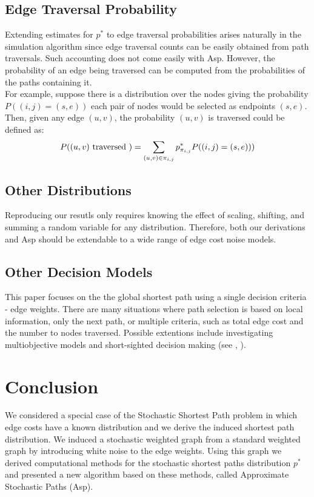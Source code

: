 \documentclass[twocolumn]{article}
\begin{document}
\subsection{Edge Traversal Probability}
Extending estimates for $p^{*}$ to edge traversal probabilities arises naturally in the simulation algorithm since edge traversal counts can be easily obtained from path traversals. Such accounting does not come easily with Asp. However, the probability of an edge being traversed can be computed from the probabilities of the paths containing it. \\

For example, suppose there is a distribution over the nodes giving the probability $P( (i,j) = (s,e))$ each pair of nodes would be selected as endpoints $(s,e)$. Then, given any edge $(u,v)$, the probability $(u,v)$ is traversed could be defined as:
\begin{gather}
P( (u,v) \text{ traversed } ) = \sum_{(u,v) \in \pi_{i,j}} p^{*}_{\pi_{i,j}} P( (i,j) = (s,e))) \notag
\end{gather}


\subsection{Other Distributions}
Reproducing our resutls only requires knowing the effect of scaling, shifting, and summing a random variable for any distribution. Therefore, both our derivations and Asp should be extendable to a wide range of edge cost noise models.

\subsection{Other Decision Models}
This paper focuses on the the global shortest path using a single decision criteria - edge weights. There are many situations where path selection is based on local information, only the next path, or multiple criteria, such as total edge cost and the number to nodes traversed. Possible extentions include investigating multiobjective models and short-sighted decision making (see \cite{multiobj}, \cite{hall_1986}).


\section{Conclusion}
We considered a special case of the Stochastic Shortest Path problem in which edge costs have a known distribution and we derive the induced shortest path distribution. We induced a stochastic weighted graph from a standard weighted graph by introducing white noise to the edge weights. Using this graph we derived computational methods for the stochastic shortest paths distribution $p^*$ and presented a new algorithm based on these methods, called Approximate Stochastic Paths (Asp). \\
\end{document}
